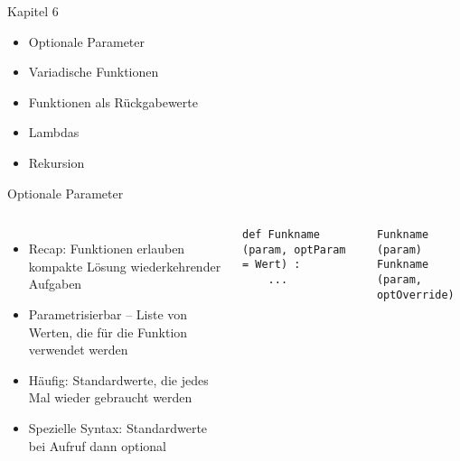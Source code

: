 
\begin{frame}[fragile]{Kapitel 6}
%
\begin{itemize}
\item Optionale Parameter
\item Variadische Funktionen
\item Funktionen als Rückgabewerte
\item Lambdas
\item Rekursion
\end{itemize}
%
\end{frame}


\begin{frame}[fragile]{Optionale Parameter}
%
\begin{columns}[T]
\begin{itemize}
\item Recap: Funktionen erlauben kompakte Lösung wiederkehrender Aufgaben
\item Parametrisierbar -- Liste von Werten, die für die Funktion verwendet werden
\item Häufig: Standardwerte, die jedes Mal wieder gebraucht werden
\item Spezielle Syntax: Standardwerte bei Aufruf dann optional
\end{itemize}
%
\begin{codebox}
\begin{verbatim}
def Funkname (param, optParam = Wert) :
    ...
\end{verbatim}
\end{codebox}
%
\begin{codebox}
\begin{verbatim}
Funkname (param)
Funkname (param, optOverride)
\end{verbatim}
\end{codebox}
\end{columns}
%
\end{frame}


